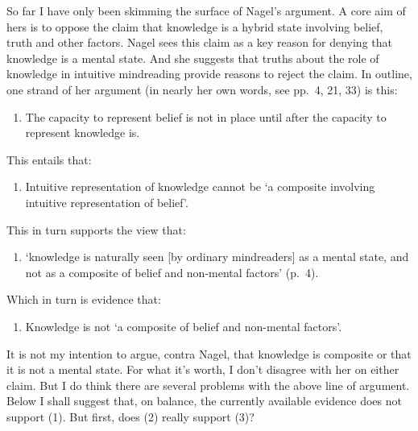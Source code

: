 \documentclass[11pt,a4paper]{extarticle}
\begin{document}
So far I have only been skimming the surface of Nagel's argument.
A core aim of hers is to oppose the claim that knowledge is a hybrid state involving belief, truth and other factors.
Nagel sees this claim as a key reason for denying that knowledge is a mental state.
And she suggests that truths about the role of knowledge in intuitive mindreading provide reasons to reject the claim.
In outline, one strand of her argument (in nearly her own words, see pp.\ 4, 21, 33) is this:
%
\begin{enumerate}
\item The capacity to represent belief is not in place until after the capacity to represent knowledge is.
\end{enumerate}
This entails that:
\begin{enumerate}[resume]
\item Intuitive representation of knowledge cannot be `a composite involving intuitive representation of belief'.
\end{enumerate}
This in turn supports the view  that:
\begin{enumerate}[resume]
\item `knowledge is naturally seen [by ordinary mindreaders] as a mental state, and not as a composite of belief and non-mental factors' (p.\ 4).
\end{enumerate}
Which in turn is evidence that:
\begin{enumerate}[resume]
\item Knowledge is not `a composite of belief and non-mental factors'.
\end{enumerate}
%
It is not my intention to argue, contra Nagel, that knowledge is composite or that it is not a mental state.
For what it's worth,
I don't disagree with her on either claim.
But I do think there are several problems with the above line of argument.
Below I shall suggest that, on balance, the currently available evidence does not support (1).  
But first, does (2) really support (3)?
\end{document}
